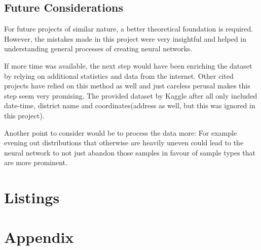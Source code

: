 \documentclass[12pt,a4paper]{scrartcl}
\begin{document}
\subsection{Future Considerations}\label{ss:future_considerations}
For future projects of similar nature, a better theoretical foundation is required. However, the mistakes made in this project were very insightful and helped in understanding general processes of creating neural networks.

If more time was available, the next step would have been enriching the dataset by relying on additional statistics and data from the internet. Other cited projects have relied on this method as well and just careless perusal makes this step seem very promising. The provided dataset by Kaggle after all only included date-time, district name and coordinates(address as well, but this was ignored in this project).

Another point to consider would be to process the data more: For example evening out distributions that otherwise are heavily uneven could lead to the neural network to not just abandon those samples in favour of sample types that are more prominent.

\pagebreak
\section{Listings}\label{s:listings}
\label{bib}
\listoffigures\label{s:ListOfFigures}
\listoftables\label{s:ListOfTables}
\lstlistoflistings\label{s:ListOfListings}

\pagebreak
\appendix
\section{Appendix}\label{s:appendix}




\end{document}
